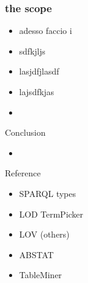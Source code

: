 \documentclass{beamer}
\begin{document}

\begin{frame}
	\frametitle{the scope}
	\begin{itemize}
		\item adesso faccio i 
		\item sdfkjljs
		\item lasjdfjlasdf
		\item lajsdfkjas
		\item 
	\end{itemize}
\end{frame}



\begin{frame}{Conclusion}
	\begin{itemize}
		\item
	\end{itemize}
\end{frame}

\begin{frame}{Reference}
	\begin{itemize}
		\item SPARQL types
		\item LOD TermPicker
		\item LOV (others)
		\item ABSTAT
		\item TableMiner
	\end{itemize}
\end{frame}
\end{document}
